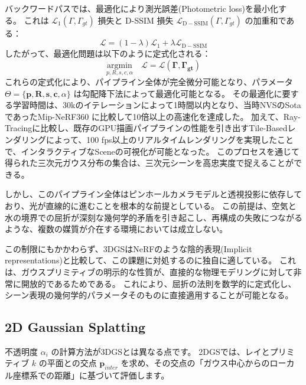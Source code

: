 バックワードパスでは、最適化により測光誤差(Photometric loss)を最小化する。
これは $\mathcal{L}_1 (\Gamma, \Gamma_{gt})$ 損失と D-SSIM 損失 $\mathcal{L}_\mathrm{D-SSIM} (\Gamma, \Gamma_{gt})$ \parencite{Zhou2004_SSIM} の加重和である：
\begin{equation}\label{eq:loss-function}
  \mathcal{L} = (1 - \lambda) \mathcal{L}_1 + \lambda \mathcal{L}_\mathrm{D-SSIM}
\end{equation}
したがって、最適化問題は以下のように定式化される：
\begin{equation}\label{eq:optimization}
  \underset{p, R, s, c, \alpha}{\textrm{argmin}} \quad \mathcal{L} = \mathcal{L}(\bm{\Gamma}, \bm{\Gamma_{gt}}) 
\end{equation}
これらの定式化により、パイプライン全体が完全微分可能となり、パラメータ $\Theta = \{\bm{p}, \bm{R}, \bm{s}, \bm{c}, \alpha\}$ は勾配降下法によって最適化可能となる。
その最適化に要する学習時間は、30kのイテレーションによって1時間以内となり、当時NVSのSotaであったMip-NeRF360 \parencite{Barron2022CVPR_Mip-NeRF360} に比較して10倍以上の高速化を達成した。
加えて、Ray-Tracingに比較し、既存のGPU描画パイプラインの性能を引き出すTile-Basedレンダリングによって、100 fps以上のリアルタイムレンダリングを実現したことで、インタラクティブなSceneの可視化が可能となった。
このプロセスを通じて得られた三次元ガウス分布の集合は、三次元シーンを高忠実度で捉えることができる。


しかし、このパイプライン全体はピンホールカメラモデルと透視投影に依存しており、光が直線的に進むことを根本的な前提としている。
この前提は、空気と水の境界での屈折が深刻な幾何学的矛盾を引き起こし、再構成の失敗につながるような、複数の媒質が介在する環境においては成立しない。

この制限にもかかわらず、3DGSはNeRFのような陰的表現(Implicit representations)と比較して、この課題に対処するのに独自に適している。
これは、ガウスプリミティブの明示的な性質が、直接的な物理モデリングに対して非常に開放的であるためである。
これにより、屈折の法則を数学的に定式化し、シーン表現の幾何学的パラメータそのものに直接適用することが可能となる。


\subsection{2D Gaussian Splatting}\label{sec:2DGS}
不透明度 $\alpha_i$ の計算方法が3DGSとは異なる点です。
2DGSでは、レイとプリミティブ $k$ の平面との交点 $\mathbf{p}_{inter}$ を求め、その交点の「ガウス中心からのローカル座標系での距離」に基づいて評価します。




